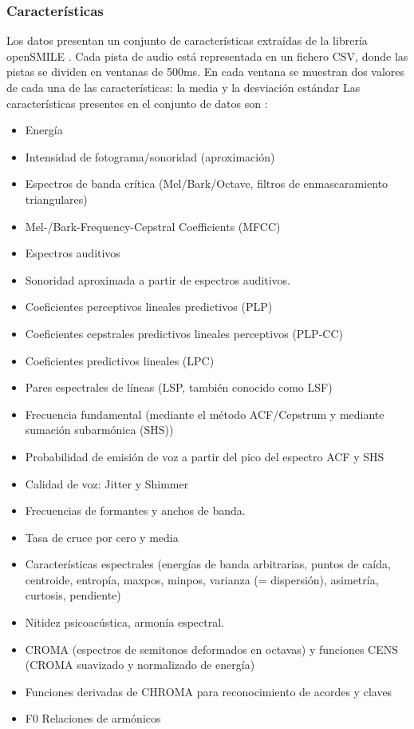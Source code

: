 \documentclass[12pt,a4paper,Spanish]{article}
\begin{document}
\subsubsection{Características}
Los datos presentan un conjunto de características extraídas de la librería openSMILE \cite{openSMILE}. Cada pista de audio está representada en un fichero CSV, donde las pistas se dividen en ventanas de 500ms. En cada ventana se muestran dos valores de cada una de las características: la media y la desviación estándar
Las características presentes en el conjunto de datos son \cite{openSMILEfeatures}:
\begin{itemize}
	\item Energía
	\item Intensidad de fotograma/sonoridad (aproximación)
	\item Espectros de banda crítica (Mel/Bark/Octave, filtros de enmascaramiento triangulares)
	\item Mel-/Bark-Frequency-Cepstral Coefficients (MFCC)
	\item Espectros auditivos
	\item Sonoridad aproximada a partir de espectros auditivos.
	\item Coeficientes perceptivos lineales predictivos (PLP)
	\item Coeficientes cepstrales predictivos lineales perceptivos (PLP-CC)
	\item Coeficientes predictivos lineales (LPC)
	\item Pares espectrales de líneas (LSP, también conocido como LSF)
	\item Frecuencia fundamental (mediante el método ACF/Cepstrum y mediante sumación subarmónica (SHS))
	\item Probabilidad de emisión de voz a partir del pico del espectro ACF y SHS
	\item Calidad de voz: Jitter y Shimmer
	\item Frecuencias de formantes y anchos de banda.
	\item Tasa de cruce por cero y media
	\item Características espectrales (energías de banda arbitrarias, puntos de caída, centroide, entropía, maxpos, minpos, varianza (= dispersión), asimetría, curtosis, pendiente)
	\item Nitidez psicoacústica, armonía espectral.
	\item  CROMA (espectros de semitonos deformados en octavas) y funciones CENS (CROMA suavizado y normalizado de energía)
	\item Funciones derivadas de CHROMA para reconocimiento de acordes y claves
	\item F0 Relaciones de armónicos
\end{itemize}
\end{document}
